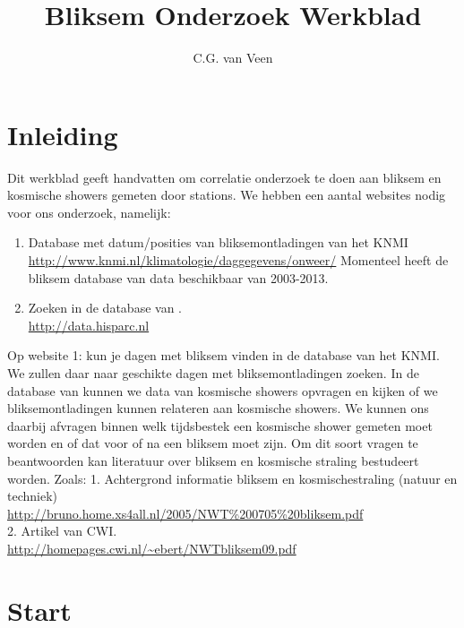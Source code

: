 

\usepackage{lipsum}

\title{Bliksem Onderzoek Werkblad}
\author{C.G. van Veen}



\maketitle

\section{Inleiding}

Dit werkblad geeft handvatten om correlatie onderzoek te doen aan bliksem en 
kosmische showers gemeten door \hisparc stations. 
We hebben een aantal websites nodig voor ons onderzoek, namelijk:
\begin{enumerate}
    \item Database met datum/posities van bliksemontladingen van het KNMI\\
    \url{ http://www.knmi.nl/klimatologie/daggegevens/onweer/}
    Momenteel heeft de bliksem database van \hisparc data beschikbaar van 2003-2013.
    
    \item Zoeken in de database van \hisparc.\\
    \url{http://data.hisparc.nl}
\end{enumerate}

Op website 1: kun je dagen met bliksem vinden in de database van het KNMI. 
We zullen daar naar geschikte dagen met bliksemontladingen zoeken.
In de database van \hisparc kunnen we data van kosmische showers opvragen en
kijken of we bliksemontladingen kunnen relateren aan kosmische showers.
We kunnen ons daarbij afvragen binnen welk tijdsbestek een kosmische shower gemeten
moet worden en of dat voor of na een bliksem moet zijn. Om dit soort vragen te 
beantwoorden kan literatuur over bliksem en kosmische straling bestudeert worden.
Zoals:
1. Achtergrond informatie bliksem en kosmischestraling (natuur en techniek)\\
\url{ http://bruno.home.xs4all.nl/2005/NWT%200705%20bliksem.pdf}\\
2. Artikel van CWI.\\
\url{http://homepages.cwi.nl/~ebert/NWTbliksem09.pdf}\\

\section{Start}

